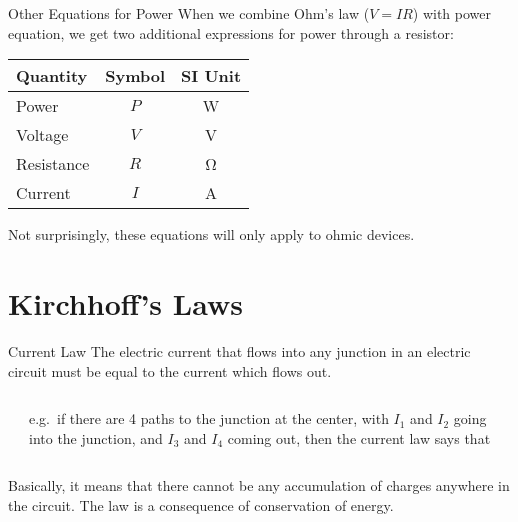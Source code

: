 \documentclass[12pt,aspectratio=169]{beamer}
\newcommand{\eq}[2]{\vspace{#1}{\Large\begin{displaymath}#2\end{displaymath}}}
\begin{document}
\begin{frame}{Other Equations for Power}
  When we combine Ohm's law ($V=IR$) with power equation, we get two additional
  expressions for power through a resistor:

  \eq{-.15in}{
    \boxed{P=\frac{V^2}R}\quad\boxed{P=I^2R}
  }
  \begin{center}
    \begin{tabular}{l|c|c}
      \rowcolor{pink}
      \textbf{Quantity} & \textbf{Symbol} & \textbf{SI Unit} \\ \hline
      Power      & $P$ & \si{\watt} \\
      Voltage    & $V$ & \si{\volt} \\
      Resistance & $R$ & \si{\ohm}  \\
      Current    & $I$ & \si{\ampere}
    \end{tabular}
  \end{center}
  Not surprisingly, these equations will only apply to ohmic devices.
\end{frame}


\section{Kirchhoff's Laws}

\begin{frame}{Current Law}
  The electric current that flows into any junction in an electric circuit must
  be equal to the current which flows out.

  \vspace{.2in}
  \begin{columns}
    \begin{center}
    \end{center}
    
    e.g.\ if there are 4 paths to the junction at the center, with $I_1$ and
    $I_2$ going into the junction, and $I_3$ and $I_4$ coming out, then the
    current law says that

    \eq{-.3in}{
      I_1+I_2-I_3-I_4=0
    }
  \end{columns}

  \vspace{.2in}Basically, it means that there cannot be any accumulation of
  charges anywhere in the circuit. The law is a consequence of conservation of
  energy.
\end{frame}
\end{document}
